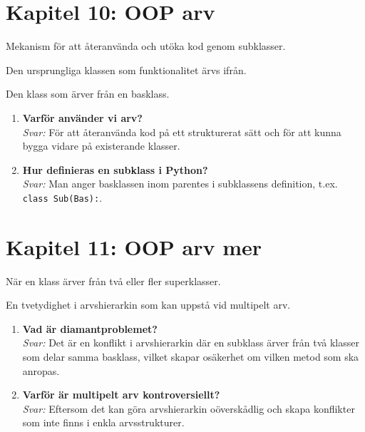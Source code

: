 \documentclass[11pt,a4paper]{article}
\begin{document}
\section{Kapitel 10: OOP arv}
\begin{description}[style=nextline, leftmargin=1cm, labelindent=0.5cm]
    \item[\color{primary}Arv] Mekanism för att återanvända och utöka kod genom subklasser.
    \item[\color{primary}Basklass] Den ursprungliga klassen som funktionalitet ärvs ifrån.
    \item[\color{primary}Subklass] Den klass som ärver från en basklass.
\end{description}

\begin{enumerate}[label=\bfseries\color{primary}Fråga \arabic*:, leftmargin=1.8cm]
    \item \textbf{Varför använder vi arv?}
    \\ \textit{Svar:} För att återanvända kod på ett strukturerat sätt och för att kunna bygga vidare på existerande klasser.
    
    \item \textbf{Hur definieras en subklass i Python?}
    \\ \textit{Svar:} Man anger basklassen inom parentes i subklassens definition, t.ex. \texttt{class Sub(Bas):}.
\end{enumerate}

\section{Kapitel 11: OOP arv mer}

\begin{description}[style=nextline, leftmargin=1cm, labelindent=0.5cm]
    \item[\color{primary}Multipelt arv] När en klass ärver från två eller fler superklasser.
    \item[\color{primary}Diamantproblemet] En tvetydighet i arvshierarkin som kan uppstå vid multipelt arv.
\end{description}

\begin{enumerate}[label=\bfseries\color{primary}Fråga \arabic*:, leftmargin=1.8cm]
    \item \textbf{Vad är diamantproblemet?}
    \\ \textit{Svar:} Det är en konflikt i arvshierarkin där en subklass ärver från två klasser som delar samma basklass, vilket skapar osäkerhet om vilken metod som ska anropas.
    
    \item \textbf{Varför är multipelt arv kontroversiellt?}
    \\ \textit{Svar:} Eftersom det kan göra arvshierarkin oöverskådlig och skapa konflikter som inte finns i enkla arvsstrukturer.
\end{enumerate}
\end{document}
